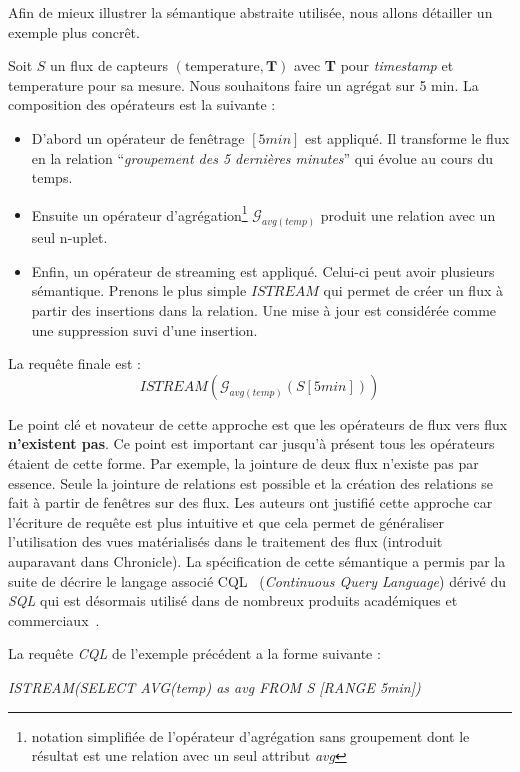 Afin de mieux illustrer la sémantique abstraite utilisée, nous allons détailler un exemple plus concrêt.
\begin{example}
Soit $S$ un flux de capteurs $(\mathrm{temperature}, \textbf{T})$ avec \textbf{T} pour \textit{timestamp} et temperature pour sa mesure. Nous souhaitons faire un agrégat sur 5 min. La composition des opérateurs est la suivante :
\begin{itemize}
\item D'abord un opérateur de fenêtrage $[5min]$ est appliqué. Il transforme le flux en la relation \enquote{\it groupement des 5 dernières minutes} qui évolue au cours du temps.
\item Ensuite un opérateur d'agrégation\footnote{notation simplifiée de l'opérateur d'agrégation sans groupement dont le résultat est une relation avec un seul attribut \textit{avg}} $\mathcal G_{avg(temp)}$ produit une relation avec un seul n-uplet.
\item Enfin, un opérateur de \textup{streaming} est appliqué. Celui-ci peut avoir plusieurs sémantique. Prenons le plus simple $ISTREAM$ qui permet de créer un flux à partir des insertions dans la relation. Une mise à jour est considérée comme une suppression suvi d'une insertion.
\end{itemize}
La requête finale est : $$ISTREAM(\mathcal G_{avg(temp)}(S[5min]))$$
\end{example}

Le point clé et novateur de cette approche est que les opérateurs de flux vers flux \textbf{n'existent pas}. Ce point est important car jusqu'à présent tous les opérateurs étaient de cette forme. Par exemple, la jointure de deux flux n'existe pas par essence. Seule la jointure de relations est possible et la création des relations se fait à partir de fenêtres sur des flux. Les auteurs ont justifié cette approche car l'écriture de requête est plus intuitive et que cela permet de généraliser l'utilisation des vues matérialisés dans le traitement des flux (introduit auparavant dans Chronicle). La spécification de cette sémantique a permis par la suite de décrire le langage associé CQL~\cite{Arasu:cql} (\textit{Continuous Query Language}) dérivé du \textit{SQL} qui est désormais utilisé dans de nombreux produits académiques et commerciaux~\cite{Witkowski:oraclecq,url:sqlstream}.

\begin{example}
La requête \textit{CQL} de l'exemple précédent a la forme suivante : 
\begin{center}
\it ISTREAM(SELECT AVG(temp) as avg FROM S [RANGE 5min])
\end{center}
\end{example}

